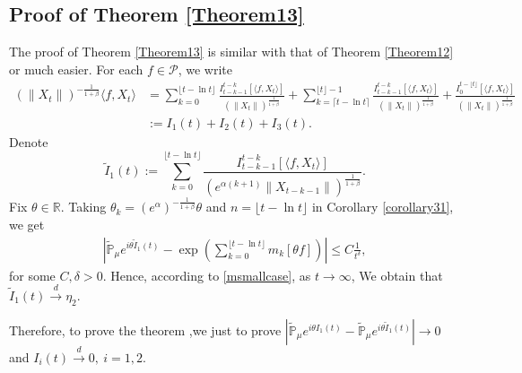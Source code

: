 \documentclass[12pt,oneside,english]{amsart}
\theoremstyle{plain}
\theoremstyle{definition}
\numberwithin{equation}{section}
\begin{document}
\subsection{Proof of Theorem \ref{Theorem13}}
The proof of Theorem \ref{Theorem13} is similar with that of Theorem \ref{Theorem12} or much easier.
     For each $f\in \mathcal{P}$, we write
    \begin{align*}
        (\|X_t\|)^{-\frac{1}{1+\beta}}\langle f,X_t\rangle&=\sum_{k=0}^{\lfloor t-\ln t \rfloor} \frac{I_{t-k-1}^{t-k}[\langle f ,X_t\rangle]}{(\|X_t\|)^{\frac{1}{1+\beta}}}+\sum_{k=\lceil t-\ln t \rceil}^{\lfloor t \rfloor-1} \frac{I_{t-k-1}^{t-k}[\langle f ,X_t\rangle]}{(\|X_t\|)^{\frac{1}{1+\beta}}}+\frac{I_0^{t-\lfloor t \rfloor}[\langle f ,X_t\rangle]}{(\|X_t\|)^{\frac{1}{1+\beta}}}\\
        &:=I_1(t)+I_2(t)+I_3(t).
    \end{align*}
 Denote
    $$\tilde{I}_1(t):=\sum_{k=0}^{\lfloor t-\ln t \rfloor}\frac{I_{t-k-1}^{t-k}[\langle f ,X_t\rangle]}{( e^{\alpha(k+1)}\|X_{t-k-1}\|)^{\frac{1}{1+\beta}}}.$$
    Fix $\theta\in \mathbb{R}$. Taking $\theta_k=(e^{\alpha})^{-\frac{1}{1+\beta}} \theta $ and $n={\lfloor t-\ln t \rfloor}$ in Corollary \ref{corollary31}, we get
    \begin{align*}
        \left|\mathbb{\tilde{P}}_{\mu}e^{i\theta\tilde{I}_1(t)}-\exp\left(\sum_{k=0}^{\lfloor t-\ln t \rfloor}m_k[\theta f]\right)\right|\leq C \frac{1}{t^{\delta}},
    \end{align*}
    for some $C,\delta>0$. Hence, according to \eqref{msmallcase}, as $t\rightarrow \infty$, We obtain that $\tilde{I}_1(t)\xrightarrow{d}\eta_2$.

    Therefore, to prove the theorem ,we just to prove $\left|\mathbb{\tilde{P}}_{\mu}e^{i\theta I_1(t)}-\mathbb{\tilde{P}}_{\mu}e^{i\theta\tilde{I}_1(t)}\right|\rightarrow 0$ and $I_i(t)\xrightarrow{d} 0,~i=1,2$.
\end{document}
